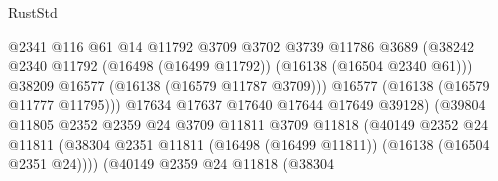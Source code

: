 \begin{lexlean}{RustStd}
\begin{coremodule}
                                              @2341
                                              @116
                                              @61
                                              @14
                                              @11792
                                              @3709
                                              @3702
                                              @3739
                                              @11786
                                              @3689
                                              (@38242
                                                @2340
                                                @11792
                                                (@16498 (@16499 @11792))
                                                (@16138 (@16504 @2340 @61)))
                                              @38209
                                              @16577
                                              (@16138 (@16579 @11787 @3709)))
                                            @16577
                                            (@16138 (@16579 @11777 @11795)))
                                          @17634
                                          @17637
                                          @17640
                                          @17644
                                          @17649
                                          @39128)
                                        (@39804
                                          @11805
                                          @2352
                                          @2359
                                          @24
                                          @3709
                                          @11811
                                          @3709
                                          @11818
                                          (@40149
                                            @2352
                                            @24
                                            @11811
                                            (@38304
                                              @2351
                                              @11811
                                              (@16498 (@16499 @11811))
                                              (@16138 (@16504 @2351 @24))))
                                          (@40149
                                            @2359
                                            @24
                                            @11818
                                            (@38304

\end{coremodule}
\end{lexlean}
